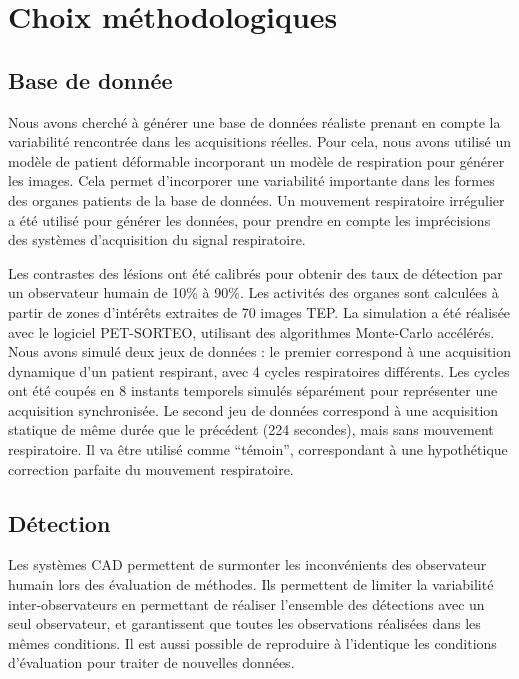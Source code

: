 \chapter{Choix méthodologiques}


\section{Base de donnée}

Nous avons cherché à générer une base de données réaliste prenant en compte la variabilité rencontrée dans les acquisitions réelles. Pour cela, nous avons utilisé un modèle de patient déformable incorporant un modèle de respiration pour générer les images. Cela permet d'incorporer une variabilité importante dans les formes des organes patients de la base de données. Un mouvement respiratoire irrégulier a été utilisé pour générer les données, pour prendre en compte les imprécisions des systèmes d'acquisition du signal respiratoire. 


Les contrastes des lésions ont été calibrés pour obtenir des taux de détection par un observateur humain de 10\% à 90\%. Les activités des organes sont calculées à partir de zones d'intérêts extraites de 70 images TEP. La simulation a été réalisée avec le logiciel PET-SORTEO, utilisant des algorithmes Monte-Carlo accélérés. Nous avons simulé deux jeux de données : le premier correspond à une acquisition dynamique d'un patient respirant, avec 4 cycles respiratoires différents. Les cycles ont été coupés en 8 instants temporels simulés séparément pour représenter une acquisition synchronisée. Le second jeu de données correspond à une acquisition statique de même durée que le précédent (224 secondes), mais sans mouvement respiratoire. Il va être utilisé comme ``témoin'', correspondant à une hypothétique correction parfaite du mouvement respiratoire.


\section{Détection}

Les systèmes CAD permettent de surmonter les inconvénients des observateur humain lors des évaluation de méthodes. Ils permettent de limiter la variabilité inter-observateurs en permettant de réaliser l'ensemble des détections avec un seul observateur, et garantissent que toutes les observations réalisées dans les mêmes conditions. Il est aussi possible de reproduire à l'identique les conditions d'évaluation pour traiter de nouvelles données.


